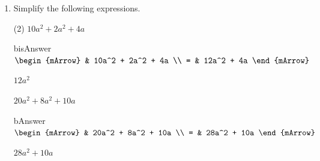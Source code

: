 \begin{enumerate}[resume]	
  \item Simplify the following expressions.
  \begin{subtask}(2)
    \task[]  $ 10a^2 + 2a^2 + 4a  $
              \begin{envOut}[height=6cm]{bisAnswer}
			       $\begin{mArrow}
			                & 10a^2  + 2a^2   + 4a      \\ 
                          = & 12a^2 + 4a  
	                \end{mArrow}$
              \end{envOut}			  
			  \begin{exercise}\begin{shortsolution}  
				       $12a^2$
			  \end{shortsolution}\end{exercise}
			  
    \task[]  $ 20a^2  + 8a^2  + 10a $
              \begin{envOut}[height=6cm]{bAnswer}
			       $\begin{mArrow}
			                & 20a^2  + 8a^2   + 10a      \\ 
                          = & 28a^2	+ 10a  
	                \end{mArrow}$
              \end{envOut}			  
			  \begin{exercise}\begin{shortsolution}  
				       $28a^2 + 10a$
			  \end{shortsolution}\end{exercise}			  
    \end{subtask}
\end{enumerate}



